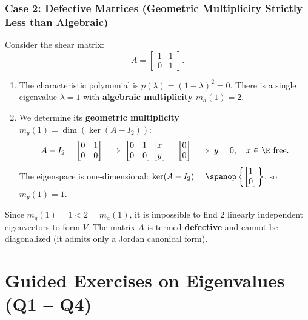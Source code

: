 \subsubsection{Case 2: Defective Matrices (Geometric Multiplicity Strictly Less than Algebraic)}
Consider the shear matrix:
\begin{equation}
    A = \begin{bmatrix} 1 & 1 \\ 0 & 1 \end{bmatrix}.
\end{equation}
\begin{enumerate}
    \item The characteristic polynomial is $p(\lambda) = (1-\lambda)^2 = 0$. There is a single eigenvalue $\lambda = 1$ with \textbf{algebraic multiplicity} $m_a(1) = 2$.
    \item We determine its \textbf{geometric multiplicity} $m_g(1) = \dim(\ker(A - I_2))$:
    \begin{equation}
        A - I_2 = \begin{bmatrix} 0 & 1 \\ 0 & 0 \end{bmatrix} \implies \begin{bmatrix} 0 & 1 \\ 0 & 0 \end{bmatrix} \begin{bmatrix} x \\ y \end{bmatrix} = \begin{bmatrix} 0 \\ 0 \end{bmatrix} \implies y = 0, \quad x \in \R \text{ free}.
    \end{equation}
    The eigenspace is one-dimensional: $\ker(A - I_2) = \spanop\left\{\begin{bmatrix} 1 \\ 0 \end{bmatrix}\right\}$, so $m_g(1) = 1$.
\end{enumerate}
Since $m_g(1) = 1 < 2 = m_a(1)$, it is impossible to find 2 linearly independent eigenvectors to form $V$. The matrix $A$ is termed \textbf{defective} and cannot be diagonalized (it admits only a Jordan canonical form).

\FloatBarrier
\section{Guided Exercises on Eigenvalues (Q1 -- Q4)}

